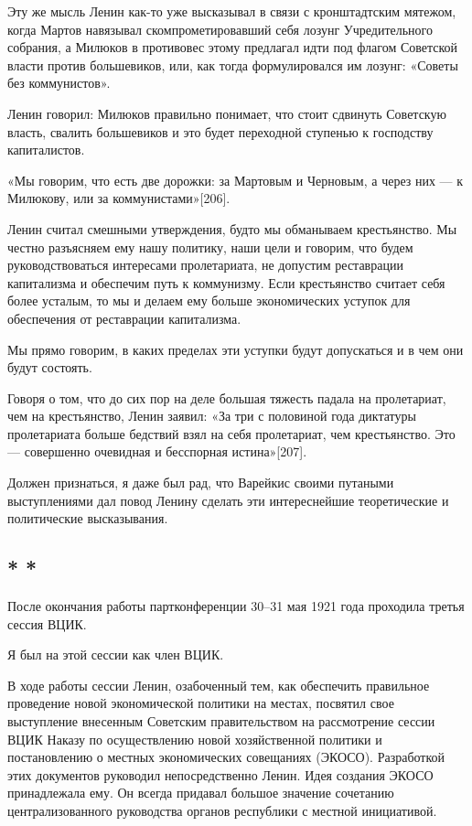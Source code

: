 \documentclass[12pt, a4paper, openany]{book}
\begin{document}
Эту же мысль Ленин как-то уже высказывал в связи с кронштадтским мятежом, когда Мартов навязывал скомпрометировавший себя лозунг Учредительного собрания, а Милюков в противовес этому предлагал идти под флагом Советской власти против большевиков, или, как тогда формулировался им лозунг: «Советы без коммунистов».

Ленин говорил: Милюков правильно понимает, что стоит сдвинуть Советскую власть, свалить большевиков и это будет переходной ступенью к господству капиталистов.

«Мы говорим, что есть две дорожки: за Мартовым и Черновым, а через них — к Милюкову, или за коммунистами»[206].

Ленин считал смешными утверждения, будто мы обманываем крестьянство. Мы честно разъясняем ему нашу политику, наши цели и говорим, что будем руководствоваться интересами пролетариата, не допустим реставрации капитализма и обеспечим путь к коммунизму. Если крестьянство считает себя более усталым, то мы и делаем ему больше экономических уступок для обеспечения от реставрации капитализма.

Мы прямо говорим, в каких пределах эти уступки будут допускаться и в чем они будут состоять.

Говоря о том, что до сих пор на деле большая тяжесть падала на пролетариат, чем на крестьянство, Ленин заявил: «За три с половиной года диктатуры пролетариата больше бедствий взял на себя пролетариат, чем крестьянство. Это — совершенно очевидная и бесспорная истина»[207].

Должен признаться, я даже был рад, что Варейкис своими путаными выступлениями дал повод Ленину сделать эти интереснейшие теоретические и политические высказывания.

\subsection*{\center * * *}

После окончания работы партконференции 30–31 мая 1921 года проходила третья сессия ВЦИК.

Я был на этой сессии как член ВЦИК.

В ходе работы сессии Ленин, озабоченный тем, как обеспечить правильное проведение новой экономической политики на местах, посвятил свое выступление внесенным Советским правительством на рассмотрение сессии ВЦИК Наказу по осуществлению новой хозяйственной политики и постановлению о местных экономических совещаниях (ЭКОСО). Разработкой этих документов руководил непосредственно Ленин. Идея создания ЭКОСО принадлежала ему. Он всегда придавал большое значение сочетанию централизованного руководства органов республики с местной инициативой.
\end{document}
